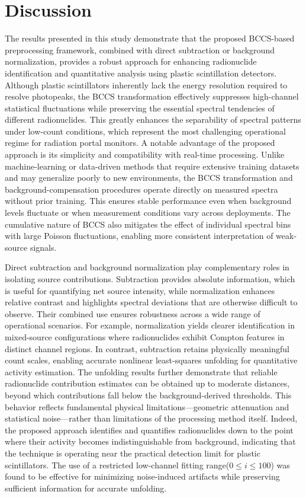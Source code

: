 \documentclass[10pt]{wlscirep}
\begin{document}
\section*{Discussion}

The results presented in this study demonstrate that the proposed BCCS-based preprocessing framework, combined with direct subtraction or background normalization, provides a robust approach for enhancing radionuclide identification and quantitative analysis using plastic scintillation detectors. Although plastic scintillators inherently lack the energy resolution required to resolve photopeaks, the BCCS transformation effectively suppresses high-channel statistical fluctuations while preserving the essential spectral tendencies of different radionuclides. This greatly enhances the separability of spectral patterns under low-count conditions, which represent the most challenging operational regime for radiation portal monitors.
A notable advantage of the proposed approach is its simplicity and compatibility with real-time processing. Unlike machine-learning or data-driven methods that require extensive training datasets and may generalize poorly to new environments, the BCCS transformation and background-compensation procedures operate directly on measured spectra without prior training. This ensures stable performance even when background levels fluctuate or when measurement conditions vary across deployments. The cumulative nature of BCCS also mitigates the effect of individual spectral bins with large Poisson fluctuations, enabling more consistent interpretation of weak-source signals.

Direct subtraction and background normalization play complementary roles in isolating source contributions. Subtraction provides absolute information, which is useful for quantifying net source intensity, while normalization enhances relative contrast and highlights spectral deviations that are otherwise difficult to observe. Their combined use ensures robustness across a wide range of operational scenarios. For example, normalization yields clearer identification in mixed-source configurations where radionuclides exhibit Compton features in distinct channel regions. In contrast, subtraction retains physically meaningful count scales, enabling accurate nonlinear least-squares unfolding for quantitative activity estimation.
The unfolding results further demonstrate that reliable radionuclide contribution estimates can be obtained up to moderate distances, beyond which contributions fall below the background-derived thresholds. This behavior reflects fundamental physical limitations—geometric attenuation and statistical noise—rather than limitations of the processing method itself. Indeed, the proposed approach identifies and quantifies radionuclides down to the point where their activity becomes indistinguishable from background, indicating that the technique is operating near the practical detection limit for plastic scintillators. The use of a restricted low-channel fitting range($0\le i \le 100$) was found to be effective for minimizing noise-induced artifacts while preserving sufficient information for accurate unfolding.
\end{document}
